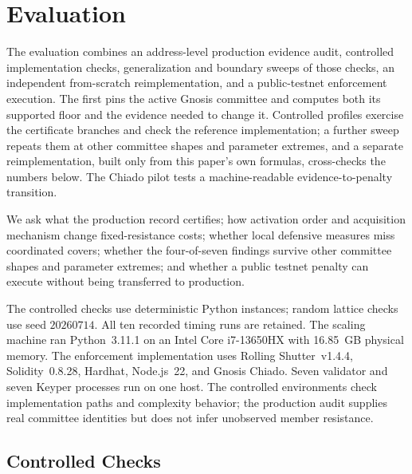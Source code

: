 \section{Evaluation}
\label{sec:evaluation}

The evaluation combines an address-level production evidence audit, controlled
implementation checks, generalization and boundary sweeps of those checks, an
independent from-scratch reimplementation, and a public-testnet enforcement
execution. The first pins the active Gnosis committee and computes both its
supported floor and the evidence needed to change it. Controlled profiles
exercise the certificate branches and check the reference implementation; a
further sweep repeats them at other committee shapes and parameter extremes,
and a separate reimplementation, built only from this paper's own formulas,
cross-checks the numbers below. The Chiado pilot tests a machine-readable
evidence-to-penalty transition.

We ask what the production record certifies; how activation order and
acquisition mechanism change fixed-resistance costs; whether local defensive
measures miss coordinated covers; whether the four-of-seven findings survive
other committee shapes and parameter extremes; and whether a public testnet
penalty can execute without being transferred to production.

The controlled checks use deterministic Python instances; random lattice
checks use seed \(20260714\). All ten recorded timing runs are retained. The
scaling machine ran Python~3.11.1 on an Intel Core i7-13650HX with 16.85~GB
physical memory. The enforcement implementation uses Rolling Shutter~v1.4.4,
Solidity~0.8.28, Hardhat, Node.js~22, and Gnosis Chiado. Seven validator and
seven Keyper processes run on one host. The controlled environments check
implementation paths and complexity behavior; the production audit supplies
real committee identities but does not infer unobserved member resistance.

\subsection{Controlled Checks}
\label{subsec:evaluation-setup}
\label{subsec:certificate-semantics-evaluation}
\label{subsec:activation-ladder-evaluation}
\label{subsec:defensive-allocation-evaluation}
\label{subsec:parameter-sensitivity-evaluation}
\label{subsec:scalability-evaluation}
\label{subsec:evaluation-baselines}

